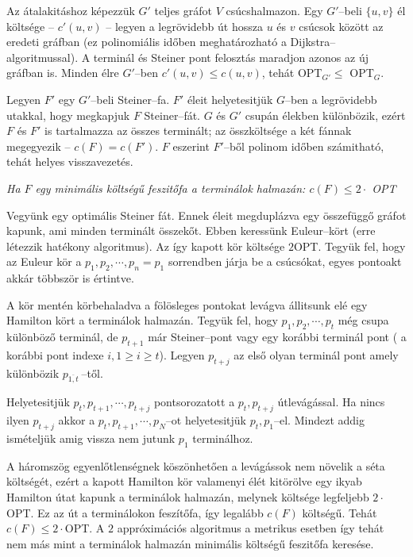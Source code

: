 Az átalakitáshoz képezzük $G'$ teljes gráfot $V$ csúcshalmazon. Egy $G'$--beli
$\{u,v\}$ él költsége -- $c'(u,v)$ -- legyen a legrövidebb út hossza $u$ és $v$
csúcsok között az eredeti gráfban (ez polinomiális időben meghatározható a
Dijkstra--algoritmussal). A terminál és Steiner pont felosztás maradjon azonos
az új gráfban is. Minden élre $G'$--ben $c'(u,v) \leq c(u,v)$, tehát OPT$_{G'}
\leq$ OPT$_{G}$.

Legyen $F'$ egy $G'$--beli Steiner--fa. $F'$ éleit helyetesitjük $G$--ben a
legrövidebb utakkal, hogy megkapjuk $F$ Steiner--fát. $G$ és $G'$ csupán élekben
különbözik, ezért $F$ és $F'$ is tartalmazza az összes terminált; az
összköltsége a két fánnak megegyezik -- $c(F)=c(F')$. $F$ eszerint $F'$--ből
polinom időben számitható, tehát helyes visszavezetés.

\vspace{0.4cm}
\emph{Ha $F$ egy minimális költségű feszitőfa a terminálok halmazán:  
$c(F) \leq  2 \cdot $ OPT}
\vspace{0.4cm}

Vegyünk egy optimális Steiner fát. Ennek éleit megduplázva egy összefüggő 
gráfot kapunk, ami minden terminált összekőt. Ebben keressünk Euleur--kört
(erre létezzik hatékony algoritmus). Az így  kapott kör költsége $2$OPT. 
Tegyük fel, hogy az Euleur kör a $p_1, p_2, \cdots, p_n=p_1$ sorrendben járja 
be a csúcsókat, egyes pontoakt akkár többször is értintve.

A kör mentén körbehaladva a fölösleges pontokat levágva állitsunk elé egy
Hamilton kört a terminálok halmazán. Tegyük fel, hogy $p_1, p_2, \cdots, p_t$
még csupa különböző terminál, de $p_{t+1}$ már Steiner--pont vagy egy korábbi
terminál pont ( a korábbi pont indexe $i, 1 \geq i \geq t$). Legyen $p_{t+j}$ az
első olyan terminál pont amely különbözik $p_{\overline{1,t}}~$--től.

Helyetesitjük $p_t, p_{t+1}, \cdots, p_{t+j}$ pontsorozatott a $p_t, p_{t+j}$
útlevágással. Ha nincs ilyen $p_{t+j}$ akkor a $p_t, p_{t+1}, \cdots, p_N$--ot
helyetesitjük $p_t,p_1$--el. Mindezt addig ismételjük amig vissza nem jutunk
$p_1$ terminálhoz. 

A háromszög egyenlőtlenségnek köszönhetően a levágássok nem növelik a séta
költségét, ezért a kapott Hamilton kör valamenyi élét kitörölve egy ikyab
Hamilton útat kapunk a terminálok halmazán, melynek költsége legfeljebb
$2\cdot$OPT. Ez az út a terminálokon feszítőfa, így legalább $c(F)$ költségű.
Tehát $c(F) \leq 2 \cdot$OPT. A $2$ appróximációs algoritmus a metrikus esetben
így tehát nem más mint a terminálok halmazán minimális költségű feszitőfa
keresése.

